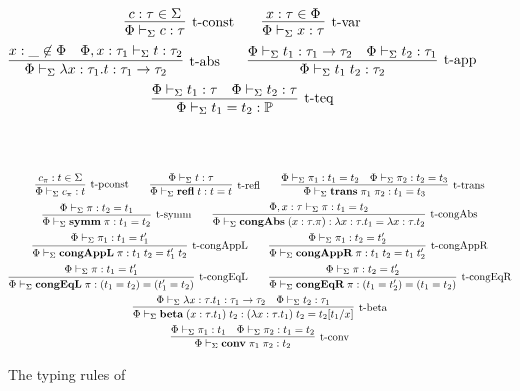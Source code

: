 \documentclass[10pt]{article}
\begin{document}
\begin{figure}[ht!]
\begin{gather*}  
\infer[\mbox{\typconst}]{
  \typeof{\Sigma}{\Phi}{c}{\tau}
}{
  c:\tau \in \Sigma
}
\qquad
\infer[\mbox{\typvar}]{
  \typeof{\Sigma}{\Phi}{x}{\tau}
}{
  x:\tau \in \Phi
}
\\
\infer[\mbox{\typabs}]{
  \typeof{\Sigma}{\Phi}{\tabs{x}{\tau_1}{t}}{\tau_1 \to \tau_2}
}{
  x:\_ \not\in\Phi 
  &
  \typeof{\Sigma}{\Phi,x:\tau_1}{t}{\tau_2}
}
\qquad
\infer[\mbox{\typapp}]{
  \typeof{\Sigma}{\Phi}{t_1\app t_2}{\tau_2}
}{
  \typeof{\Sigma}{\Phi}{t_1}{\tau_1 \to \tau_2}
  &
  \typeof{\Sigma}{\Phi}{t_2}{\tau_1}
}
\\
\infer[\mbox{\typteq}]{
  \typeof{\Sigma}{\Phi}{t_1 = t_2}{\prop}
}{
  \typeof{\Sigma}{\Phi}{t_1}{\tau}
  &
  \typeof{\Sigma}{\Phi}{t_2}{\tau}
}
\end{gather*}
\\
\\
\begin{gather*}
\infer[\mbox{\typpconst}]{
  \typeof{\Sigma}{\Phi}{c_\pi}{t}
}{
  c_\pi:t \in \Sigma
}
\qquad
\infer[\mbox{\typrefl}]{
  \typeof{\Sigma}{\Phi}{\refl t}{t = t}
}{
  \typeof{\Sigma}{\Phi}{t}{\tau}
}
\qquad
\infer[\mbox{\typtrans}]{
  \typeof{\Sigma}{\Phi}{\trans{\pi_1}{\pi_2}}{t_1 = t_3}
}{
  \typeof{\Sigma}{\Phi}{\pi_1}{t_1 = t_2}
  &
  \typeof{\Sigma}{\Phi}{\pi_2}{t_2 = t_3}
}
\\
\infer[\mbox{\typsymm}]{
  \typeof{\Sigma}{\Phi}{\symm{\pi}}{t_1 = t_2}
}{
  \typeof{\Sigma}{\Phi}{\pi}{t_2 = t_1}
}
\qquad
\infer[\mbox{\typcongabs}]{
  \typeof{\Sigma}{\Phi}{\congtabs{x}{\tau}{\pi}}{\tabs{x}{\tau}{t_1} = \tabs{x}{\tau}{t_2}}
}{
  \typeof{\Sigma}{\Phi,x:\tau}{\pi}{t_1 = t_2}
}
\\
\infer[\mbox{\typcongappl}]{
  \typeof{\Sigma}{\Phi}{\congappl{\pi}}{t_1\app t_2 = t_1'\app t_2}
}{
  \typeof{\Sigma}{\Phi}{\pi_1}{t_1 = t_1'}
}
\qquad
\infer[\mbox{\typcongappr}]{
  \typeof{\Sigma}{\Phi}{\congappr{\pi}}{t_1\app t_2 = t_1\app t_2'}
}{
  \typeof{\Sigma}{\Phi}{\pi_1}{t_2 = t_2'}
}
\\
\infer[\mbox{\typcongeql}]{
  \typeof{\Sigma}{\Phi}{\congeql{\pi}}{(t_1 = t_2) = (t_1' = t_2)}
}{
  \typeof{\Sigma}{\Phi}{\pi}{t_1 = t_1'}
}
\qquad
\infer[\mbox{\typcongeqr}]{
  \typeof{\Sigma}{\Phi}{\congeqr{\pi}}{(t_1 = t_2') = (t_1 = t_2)}
}{
  \typeof{\Sigma}{\Phi}{\pi}{t_2 = t_2'}
}
\\
\infer[\mbox{\typbeta}]{
  \typeof{\Sigma}{\Phi}{\tbetaconv{x}{\tau}{t_1}{t_2}}{(\tabs{x}{\tau}{t_1})\app t_2 = t_2[t_1/x]}
}{
  \typeof{\Sigma}{\Phi}{\tabs{x}{\tau}{t_1}}{\tau_1 \to \tau_2}
  &
  \typeof{\Sigma}{\Phi}{t_2}{\tau_1}
}
\\
\infer[\mbox{\typconv}]{
  \typeof{\Sigma}{\Phi}{\conv{\pi_1}{\pi_2}}{t_2}
}{
  \typeof{\Sigma}{\Phi}{\pi_1}{t_1}
  &
  \typeof{\Sigma}{\Phi}{\pi_2}{t_1 = t_2}
}
\end{gather*}  
  
\caption{The typing rules of \STLCE}
\label{fig:stlce-typing-rules}
\end{figure}
\end{document}
